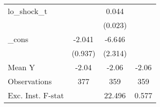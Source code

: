{\begin{tabular}{l*{3}{c}}
\addlinespace
lo\_shock\_t  &                     &       0.044\sym{*}  &                     \\
            &                     &     (0.023)         &                     \\
\addlinespace
\_cons      &      -2.041\sym{**} &      -6.646\sym{***}&                     \\
            &     (0.937)         &     (2.314)         &                     \\
\midrule
Mean Y      &       -2.04         &       -2.06         &       -2.06         \\
Observations&         377         &         359         &         359         \\
Exc. Inst. F-stat&                     &      22.496         &       0.577         \\
\bottomrule
\end{tabular}
}
